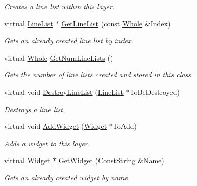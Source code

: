 \begin{DoxyCompactItemize}
\begin{DoxyCompactList}\small\item\em Creates a line list within this layer. \item\end{DoxyCompactList}\item 
virtual \hyperlink{classphys_1_1UI_1_1LineList}{LineList} $\ast$ \hyperlink{classphys_1_1UI_1_1Layer_aa0ec04b512d7c2ad2808a2dc0e435905}{GetLineList} (const \hyperlink{namespacephys_a460f6bc24c8dd347b05e0366ae34f34a}{Whole} \&Index)
\begin{DoxyCompactList}\small\item\em Gets an already created line list by index. \item\end{DoxyCompactList}\item 
virtual \hyperlink{namespacephys_a460f6bc24c8dd347b05e0366ae34f34a}{Whole} \hyperlink{classphys_1_1UI_1_1Layer_aa25225bb0011d26038959420153d9714}{GetNumLineLists} ()
\begin{DoxyCompactList}\small\item\em Gets the number of line lists created and stored in this class. \item\end{DoxyCompactList}\item 
virtual void \hyperlink{classphys_1_1UI_1_1Layer_aa0854e22fefd9378b0cdf7a217a3aeeb}{DestroyLineList} (\hyperlink{classphys_1_1UI_1_1LineList}{LineList} $\ast$ToBeDestroyed)
\begin{DoxyCompactList}\small\item\em Destroys a line list. \item\end{DoxyCompactList}\item 
virtual void \hyperlink{classphys_1_1UI_1_1Layer_ae2425e1ca2a7dd8f5912dad497f3beca}{AddWidget} (\hyperlink{classphys_1_1UI_1_1Widget}{Widget} $\ast$ToAdd)
\begin{DoxyCompactList}\small\item\em Adds a widget to this layer. \item\end{DoxyCompactList}\item 
virtual \hyperlink{classphys_1_1UI_1_1Widget}{Widget} $\ast$ \hyperlink{classphys_1_1UI_1_1Layer_a4340e70c9ab4083236d4a4c8d804c62a}{GetWidget} (\hyperlink{namespacephys_a5ce5049f8b4bf88d6413c47b504ebb31}{ConstString} \&Name)
\begin{DoxyCompactList}\small\item\em Gets an already created widget by name. \item\end{DoxyCompactList}\item 

\end{DoxyCompactItemize}
